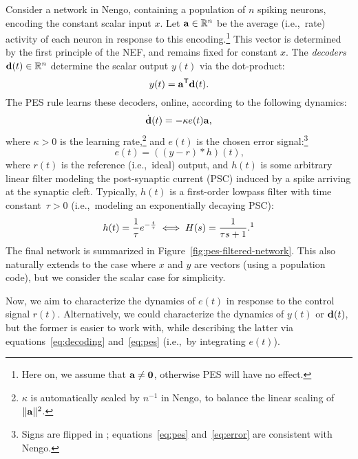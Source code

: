 Consider a network in Nengo, containing a population of $n$ spiking neurons, encoding the constant scalar input $x$.
Let $\mathbf{a} \in \mathbb{R}^n$ be the average (i.e.,~rate) activity of each neuron in response to this encoding.\footnote{Here on, we assume that $\mathbf{a} \ne \mathbf{0}$, otherwise PES will have no effect.}
This vector is determined by the first principle of the NEF, and remains fixed for constant $x$.
The \emph{decoders} $\mathbf{d}(t) \in \mathbb{R}^n$ determine the scalar output $y(t)$ via the dot-product:
\begin{equation}
\label{eq:decoding}
y(t) = {\mathbf{a}}^\mathsf{T} \mathbf{d}(t)  \text{.}
\end{equation}
The PES rule learns these decoders, online, according to the following dynamics:
\begin{equation}
\label{eq:pes}
\dot{\mathbf{d}}(t) = -\kappa e(t) \mathbf{a} \text{,}
\end{equation}
where $\kappa > 0$ is the learning rate,\footnote{$\kappa$ is automatically scaled by $n^{-1}$ in Nengo, to balance the linear scaling of $\|\mathbf{a}\|^2$.} and $e(t)$ is the chosen error signal:\footnote{Signs are flipped in \citet{voelker2015}; equations~\ref{eq:pes} and~\ref{eq:error} are consistent with Nengo.}
\begin{equation}
\label{eq:error}
e(t) = \left((y - r) \ast h \right)(t) \text{,}
\end{equation}
where $r(t)$ is the reference (i.e.,~ideal) output, and $h(t)$ is some arbitrary linear filter modeling the post-synaptic current (PSC) induced by a spike arriving at the synaptic cleft.
Typically, $h(t)$ is a first-order lowpass filter with time constant~$\tau > 0$ (i.e.,~modeling an exponentially decaying PSC): %
\begin{equation}
\label{eq:lowpass}
h(t) = \frac{1}{\tau} e^{-\frac{t}{\tau}} \iff H(s) = \frac{1}{\tau s + 1} \text{.\footnotemark}
\end{equation}
%
The final network is summarized in Figure~\ref{fig:pes-filtered-network}.
This also naturally extends to the case where $x$ and $y$ are vectors (using a population code), but we consider the scalar case for simplicity. 

Now, we aim to characterize the dynamics of $e(t)$ in response to the control signal $r(t)$.
Alternatively, we could characterize the dynamics of $y(t)$ or $\mathbf{d}(t)$, but the former is easier to work with, while describing the latter via equations~\ref{eq:decoding} and~\ref{eq:pes} (i.e.,~by integrating $e(t)$).

